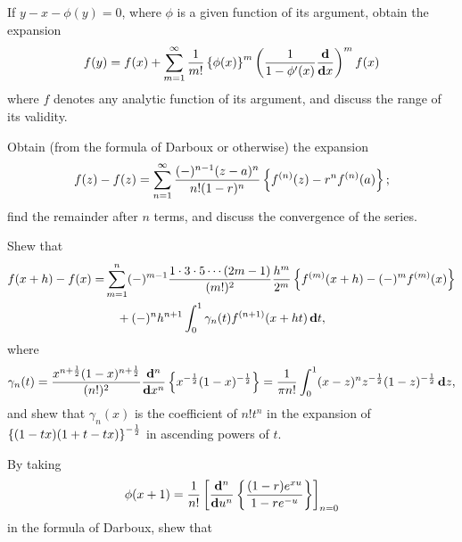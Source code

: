 \begin{wandwmiscexamples}
  \begin{wandwmiscexample}
    If $y - x - \phi(y) = 0$, where $\phi$ is a given function of
    its argument, obtain the expansion
    $$
    f(y)
    =
    f(x)
    +
    \sum_{m=1}^{\infty}
    \frac{1}{m!}
    \left\{ \phi(x) \right\}^{m}
    \left( 
      \frac{1}{1-\phi'(x)}
      \frac{\mathbf{d}}{\mathbf{d} x}
     \right)^{m}
    f(x)
    $$
    where $f$ denotes any analytic function of its argument, and discuss
    the range of its validity.
  \end{wandwmiscexample}
  \begin{wandwmiscexample}
    Obtain (from the formula of Darboux or otherwise) the expansion
    $$
    f(z) - f(z)
    =
    \sum_{n=1}^{\infty}
    \frac{(-)^{n-1} (z-a)^{n}}{n! (1-r)^{n}}
    \left\{ 
      f^{(n)}(z) - r^{n} f^{(n)}(a)
     \right\};
    $$
    find the remainder after $n$ terms, and discuss the
    convergence of the series.
  \end{wandwmiscexample}
  \begin{wandwmiscexample}
    Shew that
    \begin{align*}
      f(x+h) - f(x)
      =&
      \sum_{m=1}^{n}
      (-)^{m-1}
      \frac{1 \cdot 3 \cdot 5 \cdots (2m-1)}{(m!)^{2}}
      \frac{h^{m}}{2^{m}}
      \left\{ 
        f^{(m)}(x+h)
        -
        (-)^{m} f^{(m)}(x)
       \right\}
      \\
      & \quad
      +
      (-)^{n} h^{n+1}
      \int_{0}^{1}
      \gamma_{n}(t)
      f^{(n+1)}(x + ht) \, \mathbf{d} t,
    \end{align*}
    where
    $$
    \gamma_{n}(t)
    =
    \frac{x^{n+\frac{1}{2}} (1-x)^{n + \frac{1}{2}}}{(n!)^{2}}
    \frac{\mathbf{d}^{n}}{\mathbf{d} x^{n}}
    \left\{ 
      x^{-\frac{1}{2}} (1-x)^{-\frac{1}{2}}
     \right\}
    =
    \frac{1}{\pi n!}
    \int_{0}^{1}
    (x-z)^{n}
    z^{-\frac{1}{2}}
    (1-z)^{-\frac{1}{2}}
    \, \mathbf{d} z,
    $$
    and shew that $\gamma_{n}(x)$ is the coefficient of
    $n! t^{n}$ in the expansion of
    $\left\{  (1-tx)(1+t-tx)  \right\}^{-\frac{1}{2}}$
    in ascending powers of $t$.
  \end{wandwmiscexample}
  \begin{wandwmiscexample}
    By taking
    $$
    \phi(x+1)
    =
    \frac{1}{n!}
    \left[ 
      \frac{\mathbf{d}^{n}}{\mathbf{d} u^{n}}
      \left\{ 
        \frac{(1-r)e^{xu}}{1 - r e^{-u}}
       \right\}
     \right]_{n=0}
    $$
    in the formula of Darboux, shew that
    \begin{align*}

\end{align*}
\end{wandwmiscexample}
\end{wandwmiscexamples}
